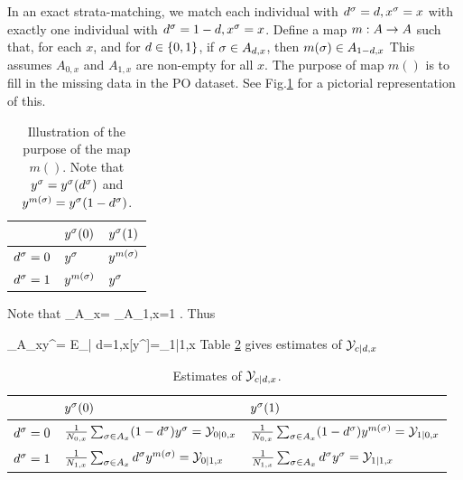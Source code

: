 In an exact   strata-matching,
we match each individual with
$ d^\sigma=d, x^\sigma=x$
with
exactly
one individual
with $ d^\sigma=1-d, x^\sigma=x$.
Define a map $m:A\rightarrow A$
such that,
for each $x$, and
for $d\in \{0,1\}$,
if $\sigma\in A_{d,x}$, then
$m(\sigma)\in A_{1-d,x}$
This assumes $A_{0,x}$ and $A_{1,x}$
are non-empty for all $x$.
The purpose of map $m()$
is
to fill in the missing data in the
PO dataset. See Fig.\ref{tab-po-s-map}
for a pictorial representation of
this.

\begin{table}[h!]
\centering
\begin{tabular}{|l|l|l|}
\hline
 & \cellcolor[HTML]{ECF4FF}$y^\sigma(0)$ & \cellcolor[HTML]{ECF4FF}$y^\sigma(1)$ \\ \hline
\cellcolor[HTML]{ECF4FF}$ d^\sigma=0$ & $y^\sigma$ & $y^{m(\sigma)}$ \\ \hline
\cellcolor[HTML]{ECF4FF}$ d^\sigma=1$ & $y^{m(\sigma)}$ & $y^\sigma$ \\ \hline
\end{tabular}
\caption{Illustration of the
purpose of the map $m()$.
Note that $y^\sigma=y^\sigma( d^\sigma)$
 and $y^{m(\sigma)}=y^\sigma(1-d^\sigma)$.}
\label{tab-po-s-map}
\end{table}



Note that
\beq
\sum_{\s\in A_{x}}=
\sum_{\s\in A_{1,x}}=1
\;.
\eeq
Thus

\beq
\sum_{\s\in A_{x}}y^\s=
E_{\s| d=1,x}[y^\s]=\caly_{1|1,x}
\eeq
Table \ref{tab-po-yc-at-dx}
gives
estimates of
$ {\cal Y}_{c| d ,x}$

{\renewcommand{\arraystretch}{1.5}
\begin{table}[h!]
\centering
\begin{tabular}{|l|l|l|}
\hline
 & \cellcolor[HTML]{ECF4FF}$y^\sigma(0)$
& \cellcolor[HTML]{ECF4FF}$y^\sigma(1)$
\\ \hline
\cellcolor[HTML]{ECF4FF}$ d^\sigma=0$
&
$\frac{1}{N_{0,x}}\sum_{\sigma\in A_x} (1- d^\sigma)y^{\sigma}={\cal Y}_{0|0,x}$
&
$\frac{1}{N_{0,x}}\sum_{\sigma\in A_x} (1- d^\sigma) y^{m(\sigma)}={\cal Y}_{1|0,x}$
\\ \hline
\cellcolor[HTML]{ECF4FF}$ d^\sigma=1$
&
 $\frac{1}{N_{1,x}}\sum_{\sigma\in A_x}  d^\sigma y^{m(\sigma)}={\cal Y}_{0|1,x}$
&
$\frac{1}{N_{1,x}}\sum_{\sigma\in A_x}  d^\sigma y^\sigma={\cal Y}_{1|1,x}$
\\ \hline
\end{tabular}
\caption{Estimates of
$ {\cal Y}_{c| d ,x}$.}
\label{tab-po-yc-at-dx}
\end{table}}

